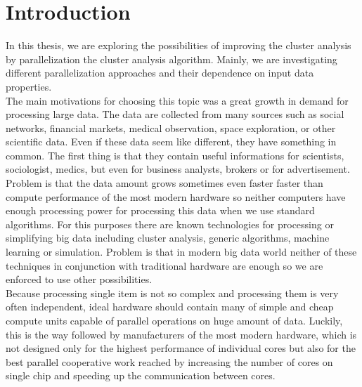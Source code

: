 \pagestyle{plain}
\setcounter{page}{1}

\chapter{Introduction}

In this thesis, we are exploring the possibilities of improving the cluster analysis by parallelization the cluster analysis algorithm. Mainly, we are investigating different parallelization approaches and their dependence on input data properties.\\
The main motivations for choosing this topic was a great growth in demand for processing large data. The data are collected from many sources such as social networks, financial markets, medical observation, space exploration, or other scientific data. Even if these data seem like different, they have something in common. The first thing is that they contain useful informations for scientists, sociologist, medics, but even for business analysts, brokers or for advertisement. %
\\

Problem is that the data amount grows sometimes even faster faster than compute performance of the most modern hardware so neither computers have enough processing power for processing this data when we use standard algorithms. For this purposes there are known technologies for processing or simplifying big data including cluster analysis, generic algorithms, machine learning or simulation.
Problem is that in modern big data world neither of these techniques in conjunction with traditional hardware are enough so we are enforced to use other possibilities. \\
Because processing single item is not so complex and processing them is very often independent, ideal hardware should contain many of simple and cheap compute units capable of parallel operations on huge amount of data. Luckily, this is the way followed by manufacturers of the most modern hardware, which is not designed only for the highest performance of individual cores but also for the best parallel cooperative work reached by increasing the number of cores on single chip and speeding up the communication between cores. \\


